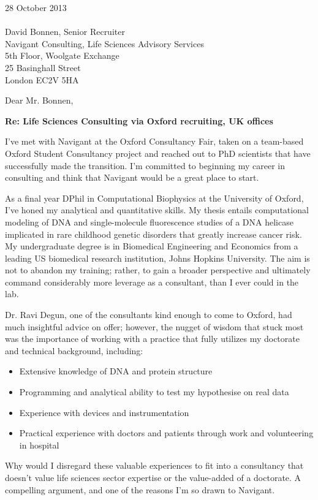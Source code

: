 \documentclass{../res}
\begin{document}
 
\begin{sloppypar}
 
%


\begin{resume} 

28 October 2013 \\ \\
David Bonnen, Senior Recruiter \\
Navigant Consulting, Life Sciences Advisory Services \\
5th Floor, Woolgate Exchange \\
25 Basinghall Street \\
London EC2V 5HA

Dear Mr. Bonnen,

\textbf{Re: Life Sciences Consulting via Oxford recruiting, UK offices}

I've met with Navigant at the Oxford Consultancy Fair, taken on a team-based Oxford Student Consultancy project and reached out to PhD scientists that have successfully made the transition. I'm committed to beginning my career in consulting and think that Navigant would be a great place to start.

As a final year DPhil in Computational Biophysics at the University of Oxford, I've honed my analytical and quantitative skills. My thesis entails computational modeling of DNA and single-molecule fluorescence studies of a DNA helicase implicated in rare childhood genetic disorders that greatly increase cancer risk. My undergraduate degree is in Biomedical Engineering and Economics from a leading US biomedical research institution, Johns Hopkins University. The aim is not to abandon my training; rather, to gain a broader perspective and ultimately command considerably more leverage as a consultant, than I ever could in the lab.

Dr. Ravi Degun, one of the consultants kind enough to come to Oxford, had much insightful advice on offer; however, the nugget of wisdom that stuck most was the importance of working with a practice that fully utilizes my doctorate and technical background, including:
\begin{itemize}[itemindent=1cm]
    \item Extensive knowledge of DNA and protein structure
    \item Programming and analytical ability to test my hypothesise on real data
    \item Experience with devices and instrumentation
    \item Practical experience with doctors and patients through work and volunteering in hospital 
\end{itemize}
Why would I disregard these valuable experiences to fit into a consultancy that doesn't value life sciences sector expertise or the value-added of a doctorate. A compelling argument, and one of the reasons I'm so drawn to Navigant.


\end{resume}
\end{sloppypar}
\end{document}
